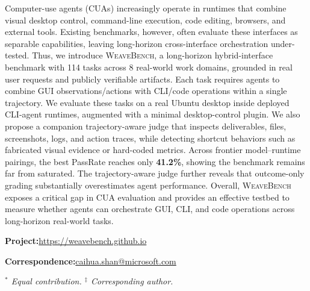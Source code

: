 \documentclass{llmxive}
\providecommand{\msftmetalabel}[1]{{\msftsans\small\bfseries #1:}\hspace{0.35em}}
\providecommand{\highlight}[1]{\textbf{#1}}
\begin{document}
\vspace{0.45em}
\begin{msfttitlebox}



\nohyphens

Computer-use agents (CUAs) increasingly operate in runtimes that combine visual desktop control, command-line execution, code editing, browsers, and external tools. Existing benchmarks, however, often evaluate these interfaces as separable capabilities, leaving long-horizon cross-interface orchestration under-tested.
Thus, we introduce \textsc{WeaveBench}, a long-horizon hybrid-interface benchmark with 114 tasks across 8 real-world work domains, grounded in real user requests and publicly verifiable artifacts.
Each task requires agents to combine GUI observations/actions with CLI/code operations within a single trajectory.
We evaluate these tasks on a real Ubuntu desktop inside deployed CLI-agent runtimes, augmented with a minimal desktop-control plugin.
We also propose a companion trajectory-aware judge that inspects deliverables, files, screenshots, logs, and action traces, while detecting shortcut behaviors such as fabricated visual evidence or hard-coded metrics.
Across frontier model--runtime pairings, the best PassRate reaches only \highlight{41.2\%}, showing the benchmark remains far from saturated.
The trajectory-aware judge further reveals that outcome-only grading substantially overestimates agent performance.
Overall, \textsc{WeaveBench} exposes a critical gap in CUA evaluation and provides an effective testbed to measure whether agents can orchestrate GUI, CLI, and code operations across long-horizon real-world tasks.


\vspace{0.14cm}
{\small
{\msftmetalabel{Project}\href{https://weavebench.github.io}{https://weavebench.github.io}\par}
{\msftmetalabel{Correspondence}\href{mailto:caihua.shan@microsoft.com}{caihua.shan@microsoft.com}\par}
}
\vspace{0.08cm}
{\footnotesize\rmfamily\itshape
$^{*}$ Equal contribution. \quad
$^{\ddagger}$ Corresponding author.\par
}
\end{msfttitlebox}
\suppressfloats[t]

\end{document}
